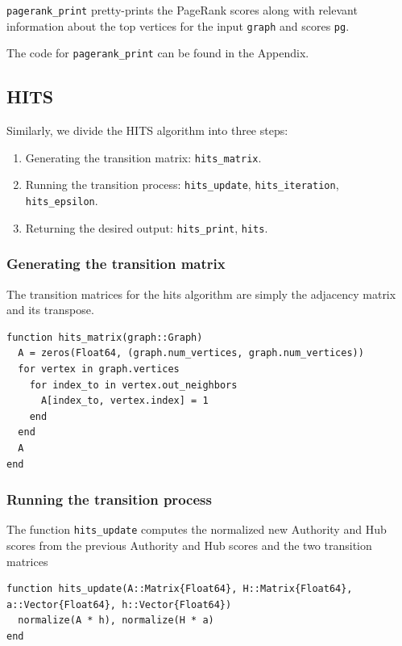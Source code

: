 \documentclass[12pt, titlepage, twoside]{amsart}
\begin{document}
\texttt{pagerank_print} pretty-prints the PageRank scores along with relevant information about the top
vertices for the input \texttt{graph} and scores \texttt{pg}.

The code for \texttt{pagerank_print} can be found in the Appendix.

\subsection{HITS}

Similarly, we divide the HITS algorithm into three steps:

\begin{enumerate}
  \item Generating the transition matrix: \texttt{hits_matrix}.
  \item Running the transition process: \texttt{hits_update}, \texttt{hits_iteration},
    \texttt{hits_epsilon}.
  \item Returning the desired output: \texttt{hits_print}, \texttt{hits}.
\end{enumerate}

\subsubsection{Generating the transition matrix}

The transition matrices for the hits algorithm are simply the adjacency matrix and its transpose.

\begin{verbatim}
function hits_matrix(graph::Graph)
  A = zeros(Float64, (graph.num_vertices, graph.num_vertices))
  for vertex in graph.vertices
    for index_to in vertex.out_neighbors
      A[index_to, vertex.index] = 1
    end
  end
  A
end
\end{verbatim}

\subsubsection{Running the transition process}

The function \texttt{hits_update} computes the normalized new Authority and Hub scores from the
previous Authority and Hub scores and the two transition matrices

\begin{verbatim}
function hits_update(A::Matrix{Float64}, H::Matrix{Float64}, a::Vector{Float64}, h::Vector{Float64})
  normalize(A * h), normalize(H * a)
end
\end{verbatim}
\end{document}
